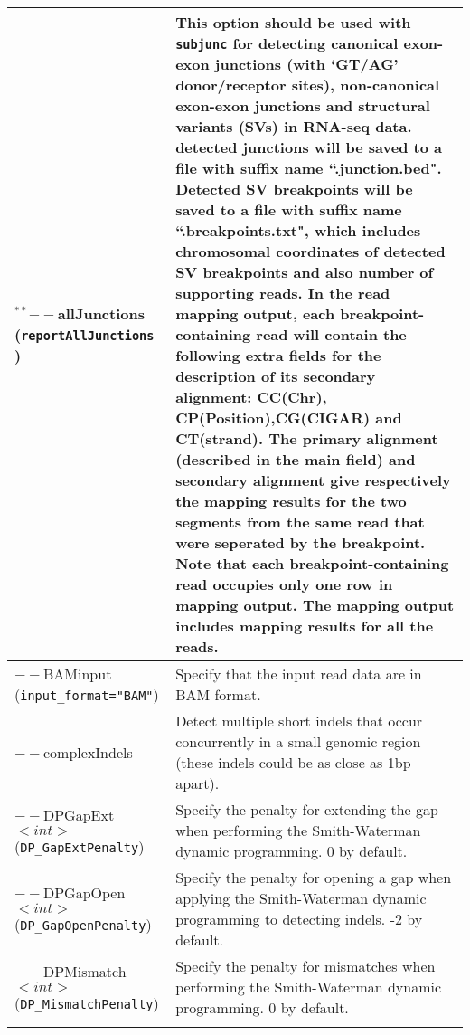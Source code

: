 \documentclass[12pt]{report}
\newcommand{\code}[1]{{\small\texttt{#1}}}
\begin{document}
\begin{longtable}{|p{4cm}|p{12cm}|}
\hline
$^{**}$$--$allJunctions \newline (\code{reportAllJunctions} \newline \code{=TRUE}) & This option should be used with \code{subjunc} for detecting canonical exon-exon junctions (with `GT/AG' donor/receptor sites), non-canonical exon-exon junctions and structural variants (SVs) in RNA-seq data. detected junctions will be saved to a file with suffix name ``.junction.bed". Detected SV breakpoints will be saved to a file with suffix name ``.breakpoints.txt", which includes chromosomal coordinates of detected SV breakpoints and also number of supporting reads. In the read mapping output, each breakpoint-containing read will contain the following extra fields for the description of its secondary alignment: CC(Chr), CP(Position),CG(CIGAR) and CT(strand). The primary alignment (described in the main field) and secondary alignment give respectively the mapping results for the two segments from the same read that were seperated by the breakpoint. Note that each breakpoint-containing read occupies only one row in mapping output. The mapping output includes mapping results for all the reads.\\
\hline
$--$BAMinput \newline (\code{input\_format="BAM"}) & Specify that the input read data are in BAM format.\\
\hline
$--$complexIndels & Detect multiple short indels that occur concurrently in a small genomic region (these indels could be as close as 1bp apart).\\
\hline
$--$DPGapExt $<int>$ \newline (\code{DP\_GapExtPenalty}) & Specify the penalty for extending the gap when performing the Smith-Waterman dynamic programming. 0 by default.\\
\hline
$--$DPGapOpen $<int>$ \newline (\code{DP\_GapOpenPenalty}) & Specify the penalty for opening a gap when applying the Smith-Waterman dynamic programming to detecting indels. -2 by default.\\
\hline
$--$DPMismatch $<int>$ \newline (\code{DP\_MismatchPenalty}) & Specify the penalty for mismatches when performing the Smith-Waterman dynamic programming.  0 by default.\\
$$
\end{longtable}
\end{document}
